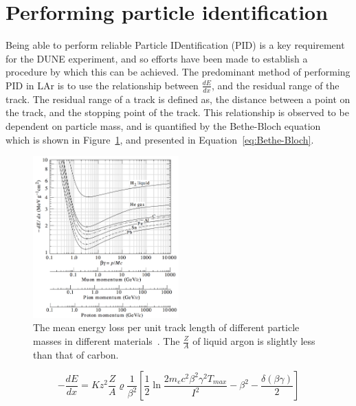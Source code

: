 \section{Performing particle identification}  \label{sec:PID} %
Being able to perform reliable Particle IDentification (PID) is a key requirement for the DUNE experiment, and so efforts have been made to establish a procedure by which this can be achieved. The predominant method of performing PID in LAr is to use the relationship between $\frac{dE}{dx}$, and the residual range of the track. The residual range of a track is defined as, the distance between a point on the track, and the stopping point of the track. This relationship is observed to be dependent on particle mass, and is quantified by the Bethe-Bloch equation~\citep{Bethe, Bloch} which is shown in Figure~\ref{fig:BetheBloch}, and presented in Equation~\ref{eq:Bethe-Bloch}. \\

\begin{figure}
  \centering
  \includegraphics[width=0.5\textwidth]{Bethe-Bloch}
  \caption[The mean energy loss per unit track length of different particle masses in different materials]
          {The mean energy loss per unit track length of different particle masses in different materials~\citep{PDGReview}. The $\frac{Z}{A}$ of liquid argon is slightly less than that of carbon.}
  \label{fig:BetheBloch}
\end{figure}

\begin{equation}
  \label{eq:Bethe-Bloch}
  -\frac{dE}{dx} = K z^2 \frac{Z}{A} \varrho \frac{1}{\beta^2} \left[ \frac{1}{2} \ln{\frac{2 m_e c^2 \beta^2 \gamma^2 T_{max}}{I^2}} - \beta^2 - \frac{\delta(\beta\gamma)}{2}\right]
\end{equation}

